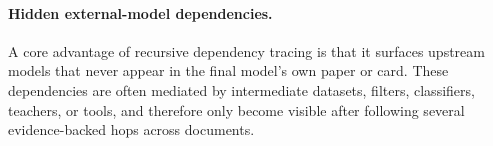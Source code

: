 
\paragraph{Hidden external-model dependencies.}

A core advantage of recursive dependency tracing is that it surfaces upstream models that never appear in the final model's own paper or card. These dependencies are often mediated by intermediate datasets, filters, classifiers, teachers, or tools, and therefore only become visible after following several evidence-backed hops across documents.

